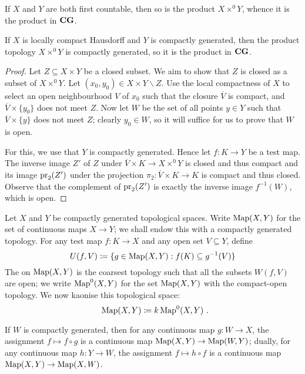\begin{exm}
	If $ X $ and $ Y $ are both first countable, then so is the product $ X \times^0 Y $, whence it is the product in $ \textbf{\textup{CG}} $.
\end{exm}

\begin{prp}
	If $ X $ is locally compact Hausdorff and $ Y $ is compactly generated, then the product topology $ X \times^0 Y $ is compactly generated, so it is the product in $ \textbf{\textup{CG}} $.
\end{prp}

\begin{proof}
	Let $ Z \subseteq X \times Y $ be a closed subset.
	We aim to show that $ Z $ is closed as a subset of $ X \times^0 Y $.
	Let $ (x_0, y_0) \in  X \times Y \smallsetminus Z $.
	Use the local compactness of $ X $ to select an open neighbourhood $ V $ of $ x_0 $ such that the closure $ \overline{ V } $ is compact, and $ \overline{ V } \times \{ y_0 \} $ does not meet $ Z $.
	Now let $ W $ be the set of all points $ y \in Y $ such that $ \overline{V} \times \{ y \} $ does not meet $ Z $;
	clearly $ y_0 \in W $, so it will suffice for us to prove that $ W $ is open.

	For this, we use that $ Y $ is compactly generated.
	Hence let $ f \colon K \to Y $ be a test map.
	The inverse image $ Z' $ of $ Z $ under $ \overline{ V } \times K \to X \times^0 Y $ is closed and thus compact and its image $ \operatorname{pr}_2(Z') $ under the projection $ \pi_2 \colon \overline{ V } \times K \to K $ is compact and thus closed.
	Observe that the complement of $ \operatorname{pr}_2(Z') $ is exactly the inverse image $ f^{-1}(W) $, which is open.
\end{proof}

\begin{cnstr}
	Let $ X $ and $ Y $ be compactly generated topological spaces.
	Write $ \operatorname{Map}(X, Y) $ for the set of continuous maps $ X \to Y $;
	we shall endow this with a compactly generated topology. 
	For any test map $ f \colon K \to X $ and any open set $ V \subseteq Y $, define
	\[
		U(f, V) \coloneq \{ g \in \operatorname{Map}(X, Y) : f(K) \subseteq g^{-1}(V) \}
	\]
	The  on $ \operatorname{Map}(X, Y) $ is the coarsest topology such that all the subsets $ W(f, V) $ are open;
	we write $ \operatorname{Map}^0(X, Y) $ for the set $ \operatorname{Map}(X, Y) $ with the compact-open topology.
	We now kaonise this topological space:
	\[
		\Map(X, Y) \coloneq k\Map^0(X, Y) \period
	\]

	If $ W $ is compactly generated, then for any continuous map $ g \colon W \to X $, the assignment $ f \mapsto f \circ g $ is a continuous map $ \operatorname{Map}( X, Y ) \to \operatorname{Map}( W, Y ) $;
	dually, for any continuous map $ h \colon Y \to W $, the assignment $ f \mapsto h \circ f $ is a continuous map $ \operatorname{Map}( X, Y ) \to \operatorname{Map}( X, W ) $.
\end{cnstr}

